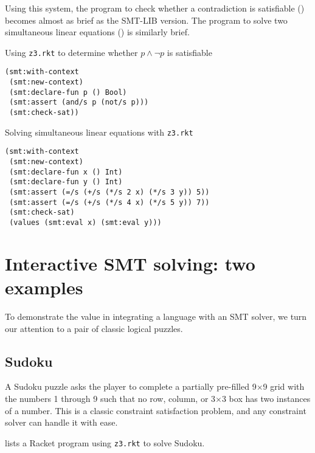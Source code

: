 Using this system, the program to check whether a contradiction is satisfiable
() becomes almost as brief as the SMT-LIB version. The
program to solve two simultaneous linear equations () is
similarly brief.

\begin{program}
\caption{Using \texttt{z3.rkt} to determine whether $p \wedge \neg p$ is satisfiable}
\label{fig:rkt-prop}
\begin{verbatim}
(smt:with-context
 (smt:new-context)
 (smt:declare-fun p () Bool)
 (smt:assert (and/s p (not/s p)))
 (smt:check-sat))
\end{verbatim}
\end{program}

\begin{program}
\caption{Solving simultaneous linear equations with \texttt{z3.rkt}}
\label{fig:rkt-simultaneous}
\begin{verbatim}
(smt:with-context
 (smt:new-context)
 (smt:declare-fun x () Int)
 (smt:declare-fun y () Int)
 (smt:assert (=/s (+/s (*/s 2 x) (*/s 3 y)) 5))
 (smt:assert (=/s (+/s (*/s 4 x) (*/s 5 y)) 7))
 (smt:check-sat)
 (values (smt:eval x) (smt:eval y)))
\end{verbatim}
\end{program}

\section{Interactive SMT solving: two examples}
\label{sec:interactive}

To demonstrate the value in integrating a language with an SMT solver, we turn
our attention to a pair of classic logical puzzles.

\subsection{Sudoku}

A Sudoku puzzle asks the player to complete a partially pre-filled 9$\times$9
grid with the numbers 1 through 9 such that no row, column, or 3$\times$3 box
has two instances of a number. This is a classic constraint satisfaction
problem, and any constraint solver can handle it with ease.

 lists a Racket program using \texttt{z3.rkt} to solve Sudoku.

